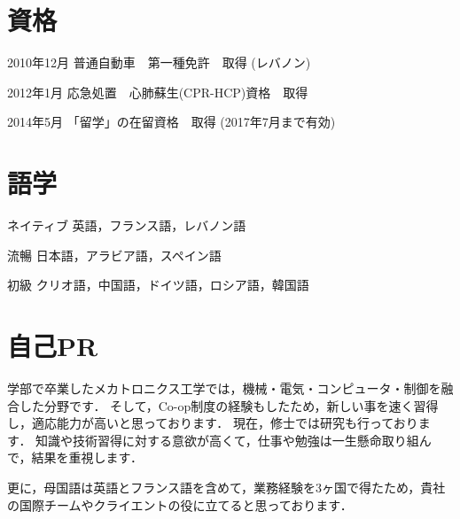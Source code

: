 \documentclass[10pt, a4paper]{article}
\begin{document}
\section{資格}
\begin{outerlist}
\item[2010年12月] 普通自動車　第一種免許　取得 (レバノン)
\item[2012年1月] 応急処置　心肺蘇生(CPR-HCP)資格　取得
\item[2014年5月] 「留学」の在留資格　取得 (2017年7月まで有効)
\end{outerlist}

\section{語学}
\begin{outerlist}
\item[ネイティブ] 英語，フランス語，レバノン語
\item[流暢] 日本語，アラビア語，スペイン語
\item[初級] クリオ語，中国語，ドイツ語，ロシア語，韓国語
\end{outerlist}

\section{自己PR}
\begin{outerlist}
\item[] 学部で卒業したメカトロニクス工学では，機械・電気・コンピュータ・制御を融合した分野です．
  そして，Co-op制度の経験もしたため，新しい事を速く習得し，適応能力が高いと思っております．
  現在，修士では研究も行っております．
  知識や技術習得に対する意欲が高くて，仕事や勉強は一生懸命取り組んで，結果を重視します．

\item[] 更に，母国語は英語とフランス語を含めて，業務経験を3ヶ国で得たため，貴社の国際チームやクライエントの役に立てると思っております．
\end{outerlist}
\end{document}

